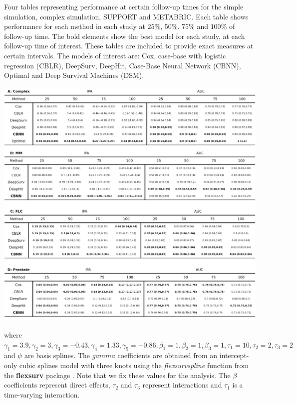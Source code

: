 \documentclass[APA,LATO1COL]{WileyNJD-v2}
\begin{document}
\begin{table}
\caption{Four tables representing performance at certain follow-up times for the simple simulation, complex simulation, SUPPORT and METABRIC. Each table shows performance for each method in each study at $25\%$, $50\%$. $75\%$ and $100\%$ of follow-up time. The bold elements show the best model for each study, at each follow-up time of interest. These tables are included to provide exact measures at certain intervals. The models of interest are: Cox, case-base with logistic regression (CBLR), DeepSurv, DeepHit, Case-Base Neural Network (CBNN), Optimal and Deep Survival Machines (DSM).}
\label{tab:megaTable}

\begin{center}\includegraphics[width=1\linewidth]{../../../analyses/figures/megaTable} \end{center}

\end{table}


where
\(\gamma_{1}=3.9, \gamma_{2}=3, \gamma_{3}=-0.43, \gamma_{4}=1.33,\gamma_{5}=-0.86, \beta_{{1}}=1, \beta_{{2}}=1, \beta_{{3}}=1, \tau_{1}=10, \tau_{2}=2, \tau_{3}=2\)
and \(\psi\) are basis splines. The \(gamma\) coefficients are obtained
from an intercept-only cubic splines model with three knots using the
\emph{flexsurvspline} function from the \textbf{flexsurv} package
\citep{flexsurv}. Note that we fix these values for the analysis. The
\(\beta\) coefficients represent direct effects, \(\tau_{2}\) and
\({\tau_3}\) represent interactions and \(\tau_{1}\) is a time-varying
interaction.
\end{document}
